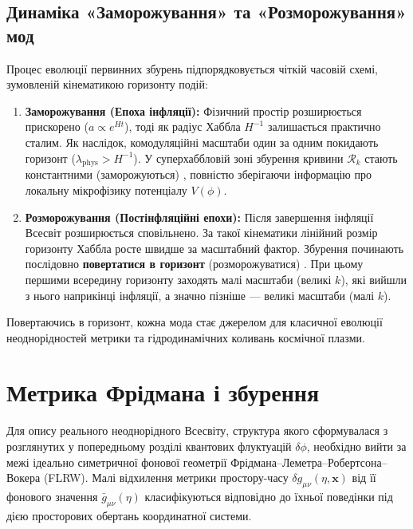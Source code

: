 \documentclass[12pt, a4paper]{article}
\begin{document}
\subsection{Динаміка «Заморожування» та «Розморожування» мод}

Процес еволюції первинних збурень підпорядковується чіткій часовій схемі, зумовленій кінематикою горизонту подій:
\begin{enumerate}
  \item \textbf{Заморожування (Епоха інфляції):} Фізичний простір розширюється прискорено ($a \propto e^{Ht}$), тоді як радіус Хаббла $H^{-1}$ залишається практично сталим. Як наслідок, комодуляційні масштаби один за одним покидають горизонт ($\lambda_{\text{phys}} > H^{-1}$). У суперхаббловій зоні збурення кривини $\mathcal{R}_k$ стають константними (заморожуються) \cite{bardeen_1980}, повністю зберігаючи інформацію про локальну мікрофізику потенціалу $V(\phi)$.
  \item \textbf{Розморожування (Постінфляційні епохи):} Після завершення інфляції Всесвіт розширюється сповільнено. За такої кінематики лінійний розмір горизонту Хаббла росте швидше за масштабний фактор. Збурення починають послідовно \textbf{повертатися в горизонт} (розморожуватися) \cite{mukhanov_2005}. При цьому першими всередину горизонту заходять малі масштаби (великі $k$), які вийшли з нього наприкінці інфляції, а значно пізніше — великі масштаби (малі $k$).
\end{enumerate}
Повертаючись в горизонт, кожна мода стає джерелом для класичної еволюції неоднорідностей метрики та гідродинамічних коливань космічної плазми.


\section{Метрика Фрідмана і збурення}

Для опису реального неоднорідного Всесвіту, структура якого сформувалася з розглянутих у попередньому розділі квантових флуктуацій $\delta\phi$, необхідно вийти за межі ідеально симетричної фонової геометрії Фрідмана--Леметра--Робертсона--Вокера (FLRW). Малі відхилення метрики простору-часу $\delta g_{\mu\nu}(\eta, \mathbf{x})$ від її фонового значення $\bar{g}_{\mu\nu}(\eta)$ класифікуються відповідно до їхньої поведінки під дією просторових обертань координатної системи.
\end{document}
